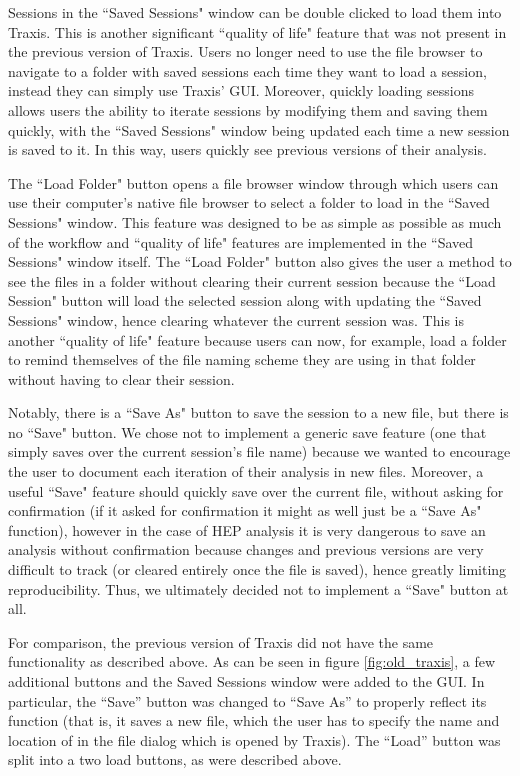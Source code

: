 \documentclass[12pt]{article} %
\begin{document}
Sessions in the ``Saved Sessions" window can be double clicked to load them into Traxis. This is another significant ``quality of life" feature that was not present in the previous version of Traxis. Users no longer need to use the file browser to navigate to a folder with saved sessions each time they want to load a session, instead they can simply use Traxis' GUI. Moreover, quickly loading sessions allows users the ability to iterate sessions by modifying them and saving them quickly, with the ``Saved Sessions" window being updated each time a new session is saved to it. In this way, users quickly see previous versions of their analysis.

The ``Load Folder" button opens a file browser window through which users can use their computer's native file browser to select a folder to load in the ``Saved Sessions" window. This feature was designed to be as simple as possible as much of the workflow and ``quality of life" features are implemented in the ``Saved Sessions" window itself. The ``Load Folder" button also gives the user a method to see the files in a folder without clearing their current session because the ``Load Session" button will load the selected session along with updating the ``Saved Sessions" window, hence clearing whatever the current session was. This is another ``quality of life" feature because users can now, for example, load a folder to remind themselves of the file naming scheme they are using in that folder without having to clear their session.

Notably, there is a ``Save As" button to save the session to a new file, but there is no ``Save" button. We chose not to implement a generic save feature (one that simply saves over the current session's file name) because we wanted to encourage the user to document each iteration of their analysis in new files. Moreover, a useful ``Save" feature should quickly save over the current file, without asking for confirmation (if it asked for confirmation it might as well just be a ``Save As" function), however in the case of HEP analysis it is very dangerous to save an analysis without confirmation because changes and previous versions are very difficult to track (or cleared entirely once the file is saved), hence greatly limiting reproducibility. Thus, we ultimately decided not to implement a ``Save" button at all.

For comparison, the previous version of Traxis did not have the same functionality as described above. As can be seen in figure \ref{fig:old_traxis}, a few additional buttons and the Saved Sessions window were added to the GUI. In particular, the ``Save'' button was changed to ``Save As'' to properly reflect its function (that is, it saves a new file, which the user has to specify the name and location of in the file dialog which is opened by Traxis). The ``Load'' button was split into a two load buttons, as were described above.
\end{document}
